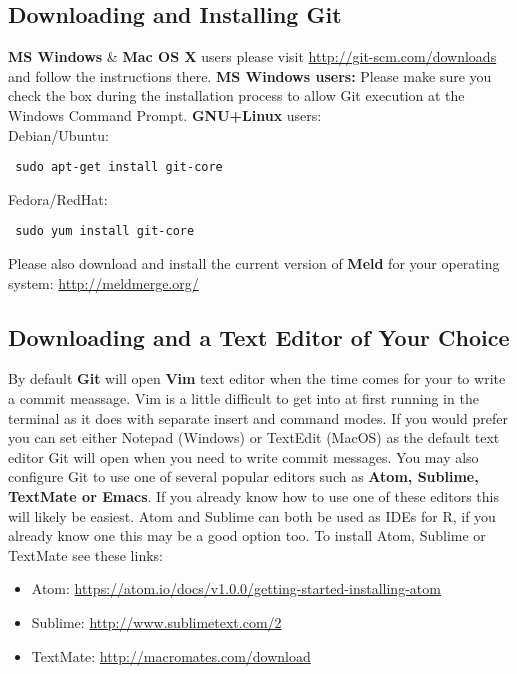\documentclass{article}[12pt]
\begin{document}
\subsection*{Downloading and Installing Git}
\textbf{MS Windows} \& \textbf{Mac OS X} users please visit \url{http://git-scm.com/downloads} and follow the instructions there.
\newline
\newline
\textbf{MS Windows users:} Please make sure you check the box during the installation process to allow Git execution at the Windows Command Prompt.
\newline
\newline
\textbf{GNU+Linux} users:\\
Debian/Ubuntu: \begin{verbatim} sudo apt-get install git-core \end{verbatim} 
Fedora/RedHat: \begin{verbatim} sudo yum install git-core \end{verbatim}

Please also download and install the current version of \textbf{Meld} for your operating system: \url{http://meldmerge.org/}

\subsection*{Downloading and a Text Editor of Your Choice}
By default \textbf{Git} will open \textbf{Vim} text editor when the time comes for your to write a commit meassage.
Vim is a little difficult to get into at first running in the terminal as it does with separate insert and command modes.
If you would prefer you can set either Notepad (Windows) or TextEdit (MacOS) as the default text editor Git will open when you need to write commit messages.  
You may also configure Git to use one of several popular editors such as \textbf{Atom, Sublime, TextMate or Emacs}.
If you already know how to use one of these editors this will likely be easiest.  
Atom and Sublime can both be used as IDEs for R, if you already know one this may be a good option too.
\newline
\newline
To install Atom, Sublime or TextMate see these links: \begin{itemize}
\item Atom: \url{https://atom.io/docs/v1.0.0/getting-started-installing-atom}
\item Sublime: \url{http://www.sublimetext.com/2}
\item TextMate: \url{http://macromates.com/download}
\end{itemize}
\end{document}
